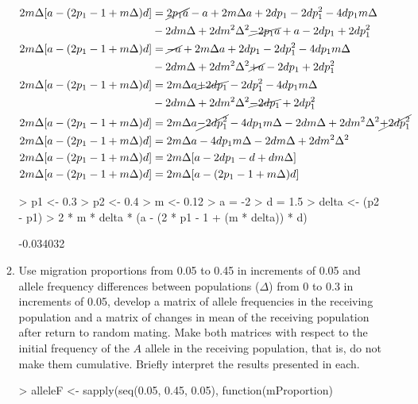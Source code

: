 \documentclass[12pt,a4paper]{paper}
\begin{document}
\begin{enumerate}
\begin{enumerate}
\begin{equation}
\begin{split}
2m\Delta[a-(2p_{1}-1+m\Delta)d] & = \cancel{2p_{1}a} - a + 2m\Delta a + 2dp_{1} - 2dp_{1}^{2} - 4dp_{1}m\Delta\\& - 2dm\Delta + 2dm^{2}\Delta^{2} \cancel{- 2p_{1}a} + a - 2dp_{1}+ 2dp_{1}^{2} \\
2m\Delta[a-(2p_{1}-1+m\Delta)d] & = \cancel{- a} + 2m\Delta a + 2dp_{1} - 2dp_{1}^{2} - 4dp_{1}m\Delta\\& - 2dm\Delta + 2dm^{2}\Delta^{2} \cancel{+ a} - 2dp_{1}+ 2dp_{1}^{2} \\
2m\Delta[a-(2p_{1}-1+m\Delta)d] & = 2m\Delta a \cancel{+ 2dp_{1}} - 2dp_{1}^{2} - 4dp_{1}m\Delta\\& - 2dm\Delta + 2dm^{2}\Delta^{2} \cancel{- 2dp_{1}} + 2dp_{1}^{2} \\
2m\Delta[a-(2p_{1} - 1 + m\Delta)d] & = 2m\Delta a \cancel{- 2dp_{1}^{2}} - 4dp_{1}m\Delta - 2dm\Delta + 2dm^{2}\Delta^{2} \cancel{ + 2dp_{1}^{2}} \\
2m\Delta[a-(2p_{1}-1+m\Delta)d] & = 2m\Delta a - 4dp_{1}m\Delta - 2dm\Delta + 2dm^{2}\Delta^{2} \\
2m\Delta[a-(2p_{1}-1+m\Delta)d] & = 2m\Delta[a - 2dp_{1} - d + dm\Delta]\\
2m\Delta[a-(2p_{1}-1+m\Delta)d] & = 2m\Delta[a - (2p_{1} - 1 + m\Delta)d]\\
\end{split}
\end{equation}
\begin{Schunk}
\begin{Sinput}
> p1 <- 0.3
> p2 <- 0.4
> m <- 0.12
> a = -2
> d = 1.5
> delta <- (p2 - p1)
> 2 * m * delta * (a - (2 * p1 - 1 +  (m * delta)) * d)
\end{Sinput}
\begin{Soutput}
[1] -0.034032
\end{Soutput}
\end{Schunk}
\item Use migration proportions from 0.05 to 0.45 in increments of 0.05 and allele frequency differences between populations ($\Delta$) from 0 to 0.3 in increments of 0.05, develop a matrix of allele frequencies in the receiving population and a matrix of changes in mean of the receiving population after return to random mating. Make both matrices with respect to the initial frequency of the $A$ allele in the receiving population, that is, do not make them cumulative. Briefly interpret the results presented in each.
\begin{Schunk}
\begin{Sinput}
> alleleF <- sapply(seq(0.05, 0.45, 0.05), function(mProportion) {
}
\end{Sinput}
\end{Schunk}
\end{enumerate}
\end{enumerate}
\end{document}

